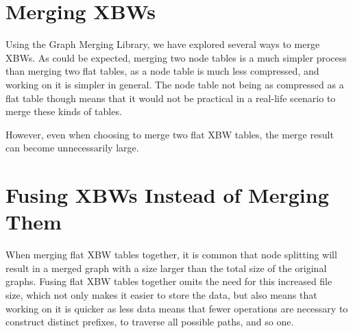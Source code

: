 \documentclass[a4paper,12pt,twoside,BCOR=10mm]{scrbook}
\begin{document}

\section{Merging XBWs}
%

Using the Graph Merging Library, we have explored several ways to merge XBWs. 
As could be expected, merging two node tables is a much simpler process than merging two flat tables, 
as a node table is much less compressed, and working on it is simpler in general. 
The node table not being as compressed as a flat table though means 
that it would not be practical in a real-life scenario to merge these kinds of tables.

However, even when choosing to merge two flat XBW tables, 
the merge result can become unnecessarily large.


\section{Fusing XBWs Instead of Merging Them}
%

When merging flat XBW tables together, it is common that node splitting 
will result in a merged graph with a size larger than the total size of the 
original graphs. 
Fusing flat XBW tables together omits the need for this increased file size, 
which not only makes it easier to store the data, but also means that working on 
it is quicker as less data means that fewer operations are necessary to construct 
distinct prefixes, to traverse all possible paths, and so one.
\end{document}
